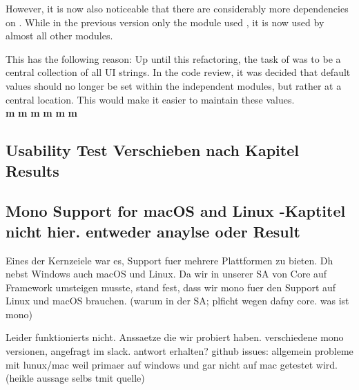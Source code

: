 However, it is now also noticeable that there are considerably more dependencies on .
While in the previous version only the module  used , it is now used by almost all other modules.

This has the following reason: Up until this refactoring, the task of  was to be a central collection of all UI strings. 
In the code review, it was decided that default values should no longer be set within the independent modules,
but rather at a central location.
This would make it easier to maintain these values. \\



\textbf{m}
\textbf{m}
\textbf{m}
\textbf{m}
\textbf{m}
\textbf{m}



\subsection{Usability Test Verschieben nach Kapitel Results}


\subsection{Mono Support for macOS and Linux -Kaptitel nicht hier. entweder anaylse oder Result}
Eines der Kernzeiele war es, Support fuer mehrere Plattformen zu bieten. Dh nebst Windows auch macOS und Linux.
Da wir in unserer SA von Core auf Framework umsteigen musste, stand fest, dass wir mono fuer den Support auf Linux und macOS brauchen.
(warum in der SA; plficht wegen dafny core. was ist mono)

Leider funktionierts nicht.
Anssaetze die wir probiert haben. verschiedene mono versionen, angefragt im slack. antwort erhalten?
github issues: allgemein probleme mit lunux/mac weil primaer auf windows und gar nicht auf mac getestet wird. (heikle aussage selbs tmit quelle)

\cite{sa}
\cite{mono-slack}
\cite{mono-git}
